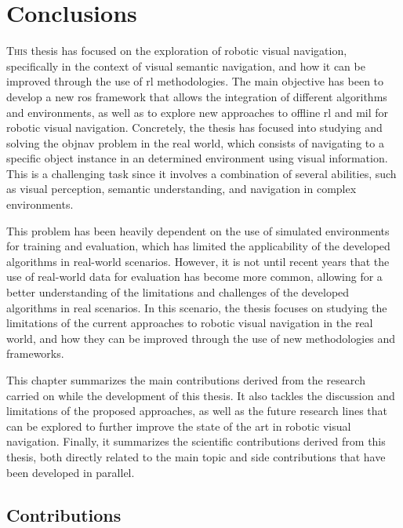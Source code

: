 \chapter{Conclusions}\label{ch:conclusions}

\lettrine{\textcolor{accent_color}{T}}{his} thesis has focused on the exploration of robotic visual navigation, specifically in the context of visual semantic navigation, and how it can be improved through the use of \acrshort{rl} methodologies.
The main objective has been to develop a new \acrshort{ros} framework that allows the integration of different algorithms and environments, as well as to explore new approaches to offline \acrshort{rl} and \acrshort{mil} for robotic visual navigation.
Concretely, the thesis has focused into studying and solving the \acrshort{objnav} problem in the real world, which consists of navigating to a specific object instance in an determined environment using visual information.
This is a challenging task since it involves a combination of several abilities, such as visual perception, semantic understanding, and navigation in complex environments.

This problem has been heavily dependent on the use of simulated environments for training and evaluation, which has limited the applicability of the developed algorithms in real-world scenarios.
However, it is not until recent years that the use of real-world data for evaluation has become more common, allowing for a better understanding of the limitations and challenges of the developed algorithms in real scenarios.
In this scenario, the thesis focuses on studying the limitations of the current approaches to robotic visual navigation in the real world, and how they can be improved through the use of new methodologies and frameworks.

This chapter summarizes the main contributions derived from the research carried on while the development of this thesis.
It also tackles the discussion and limitations of the proposed approaches, as well as the future research lines that can be explored to further improve the state of the art in robotic visual navigation.
Finally, it summarizes the scientific contributions derived from this thesis, both directly related to the main topic and side contributions that have been developed in parallel.

\section{Contributions}\label{sec:contributions}

